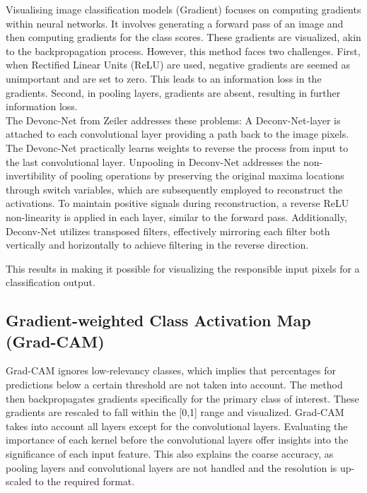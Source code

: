 Visualising image classification models (Gradient) \cite{simonyan2014deep} focuses on computing gradients within neural networks. It involves generating a forward pass of an image and then computing gradients for the class scores. These gradients are visualized, akin to the backpropagation process. However, this method faces two challenges. First, when Rectified Linear Units (ReLU) are used, negative gradients are seemed as unimportant and are set to zero. This leads to an information loss in the gradients. Second, in pooling layers, gradients are absent, resulting in further information loss.
\\
The Devonc-Net from Zeiler \cite{zeiler2013visualizing} addresses these problems:
A Deconv-Net-layer \cite{Zeiler2011AdaptiveDN} is attached to each convolutional layer providing a path back to the image pixels. The Devonc-Net practically learns weights to reverse the process from input to the last convolutional layer. Unpooling in Deconv-Net addresses the non-invertibility of pooling operations by preserving the original maxima locations through switch variables, which are subsequently employed to reconstruct the activations. To maintain positive signals during reconstruction, a reverse ReLU non-linearity is applied in each layer, similar to the forward pass. Additionally, Deconv-Net utilizes transposed filters, effectively mirroring each filter both vertically and horizontally to achieve filtering in the reverse direction.

This results in making it possible for visualizing the responsible input pixels for a classification output.

\subsection{Gradient-weighted Class Activation Map (Grad-CAM)}

Grad-CAM \cite{springenberg2015striving} ignores low-relevancy classes, which implies that percentages for predictions below a certain threshold are not taken into account. The method then backpropagates gradients specifically for the primary class of interest. These gradients are rescaled to fall within the [0,1] range and visualized. Grad-CAM takes into account all layers except for the convolutional layers. Evaluating the importance of each kernel before the convolutional layers offer insights into the significance of each input feature. This also explains the coarse accuracy, as pooling layers and convolutional layers are not handled and the resolution is up-scaled to the required format.

